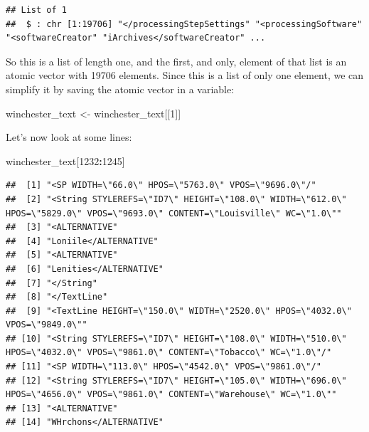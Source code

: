 \documentclass[]{gitbook}
\newenvironment{Shaded}{\begin{snugshade}}{\end{snugshade}}
\newcommand{\DecValTok}[1]{\textcolor[rgb]{0.00,0.00,0.81}{#1}}
\newcommand{\NormalTok}[1]{#1}
\newcommand{\OperatorTok}[1]{\textcolor[rgb]{0.81,0.36,0.00}{\textbf{#1}}}
\newcommand{\StringTok}[1]{\textcolor[rgb]{0.31,0.60,0.02}{#1}}
\begin{document}
\begin{verbatim}
## List of 1
##  $ : chr [1:19706] "</processingStepSettings" "<processingSoftware" "<softwareCreator" "iArchives</softwareCreator" ...
\end{verbatim}

So this is a list of length one, and the first, and only, element of that list is an atomic vector
with 19706 elements. Since this is a list of only one element, we can simplify it by saving the
atomic vector in a variable:

\begin{Shaded}
\begin{Highlighting}[]
\NormalTok{winchester_text <-}\StringTok{ }\NormalTok{winchester_text[[}\DecValTok{1}\NormalTok{]]}
\end{Highlighting}
\end{Shaded}

Let's now look at some lines:

\begin{Shaded}
\begin{Highlighting}[]
\NormalTok{winchester_text[}\DecValTok{1232}\OperatorTok{:}\DecValTok{1245}\NormalTok{]}
\end{Highlighting}
\end{Shaded}

\begin{verbatim}
##  [1] "<SP WIDTH=\"66.0\" HPOS=\"5763.0\" VPOS=\"9696.0\"/"                                                                         
##  [2] "<String STYLEREFS=\"ID7\" HEIGHT=\"108.0\" WIDTH=\"612.0\" HPOS=\"5829.0\" VPOS=\"9693.0\" CONTENT=\"Louisville\" WC=\"1.0\""
##  [3] "<ALTERNATIVE"                                                                                                                
##  [4] "Loniile</ALTERNATIVE"                                                                                                        
##  [5] "<ALTERNATIVE"                                                                                                                
##  [6] "Lenities</ALTERNATIVE"                                                                                                       
##  [7] "</String"                                                                                                                    
##  [8] "</TextLine"                                                                                                                  
##  [9] "<TextLine HEIGHT=\"150.0\" WIDTH=\"2520.0\" HPOS=\"4032.0\" VPOS=\"9849.0\""                                                 
## [10] "<String STYLEREFS=\"ID7\" HEIGHT=\"108.0\" WIDTH=\"510.0\" HPOS=\"4032.0\" VPOS=\"9861.0\" CONTENT=\"Tobacco\" WC=\"1.0\"/"  
## [11] "<SP WIDTH=\"113.0\" HPOS=\"4542.0\" VPOS=\"9861.0\"/"                                                                        
## [12] "<String STYLEREFS=\"ID7\" HEIGHT=\"105.0\" WIDTH=\"696.0\" HPOS=\"4656.0\" VPOS=\"9861.0\" CONTENT=\"Warehouse\" WC=\"1.0\"" 
## [13] "<ALTERNATIVE"                                                                                                                
## [14] "WHrchons</ALTERNATIVE"
\end{verbatim}
\end{document}
